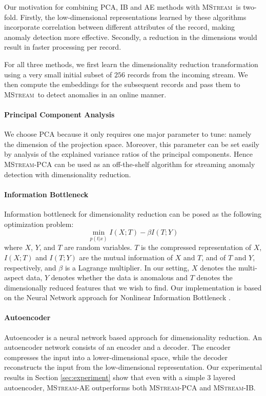 \documentclass[sigconf]{acmart}
\newcommand{\method}{\textsc{MStream}}
\begin{document}
Our motivation for combining PCA, IB and AE methods with \method\ is two-fold. Firstly, the low-dimensional representations learned by these algorithms incorporate correlation between different attributes of the record, making anomaly detection more effective. Secondly, a reduction in the dimensions would result in faster processing per record.

For all three methods, we first learn the dimensionality reduction transformation using a very small initial subset of $256$ records from the incoming stream. We then compute the embeddings for the subsequent records and pass them to \method\ to detect anomalies in an online manner.

\paragraph{\textbf{Principal Component Analysis}}

We choose PCA because it only requires one major parameter to tune: namely the dimension of the projection space. Moreover, this parameter can be set easily by analysis of the explained variance ratios of the principal components. Hence \method-PCA can be used as an off-the-shelf algorithm for streaming anomaly detection with dimensionality reduction.

\paragraph{\textbf{Information Bottleneck}}
Information bottleneck for dimensionality reduction can be posed as the following optimization problem:
$$
\min _{p(t | x)} I(X ; T)-\beta I(T ; Y)
$$
where $X$, $Y$, and $T$ are random variables. $T$ is the compressed representation of $X$, $I(X ; T)$ and $I(T ; Y)$ are the mutual information of $X$ and $T$, and of $T$ and $Y$, respectively, and $\beta$ is a Lagrange multiplier.
In our setting, $X$ denotes the multi-aspect data, $Y$ denotes whether the data is anomalous and $T$ denotes the dimensionally reduced features that we wish to find. Our implementation is based on the Neural Network approach for Nonlinear Information Bottleneck \cite{kolchinsky2017nonlinear}.


\paragraph{\textbf{Autoencoder}}
Autoencoder is a neural network based approach for dimensionality reduction. An autoencoder network consists of an encoder and a decoder. The encoder compresses the input into a lower-dimensional space, while the decoder reconstructs the input from the low-dimensional representation. Our experimental results in Section \ref{sec:experiment} show that even with a simple 3 layered autoencoder, \method-AE outperforms both \method-PCA and \method-IB.
 
\end{document}

